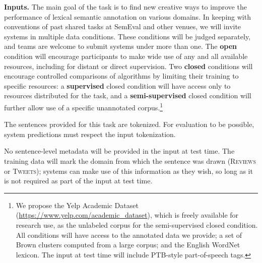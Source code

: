\documentclass[11pt]{article}
\newcommand{\ensuretext}[1]{#1}
\newcommand{\nssmarker}{\ensuretext{\textcolor{magenta}{\ensuremath{^{\textsc{NS}}_{\textsc{S}}}}}}
\newcommand{\arkcomment}[3]{\ensuretext{\textcolor{#3}{[#1 #2]}}}
\newcommand{\nss}[1]{\arkcomment{\nssmarker}{#1}{magenta}}
\newcommand{\shortversion}[1]{}
\newcommand{\longversion}[1]{#1} %
\begin{document}
\textbf{Inputs.}
The main goal of the task is to find new creative ways to improve the performance of lexical semantic annotation on various domains. 
In keeping with conventions of past shared tasks at SemEval and other venues, 
we will invite systems in multiple data conditions.
These conditions will be judged separately, and teams are welcome to submit systems under more than one.
The \textbf{open} condition will encourage participants to make 
wide use of any and all available resources, including for 
distant or direct supervision. 
Two \textbf{closed} conditions will encourage controlled comparisons of algorithms 
by limiting their training to specific resources: 
a \textbf{supervised} closed condition will have access only to resources distributed for the task, 
and a \textbf{semi-supervised} closed condition will further allow use of a specific unannotated corpus.\footnote{%
We propose the Yelp Academic Dataset (\url{https://www.yelp.com/academic_dataset}), 
which is freely available for research use, as the unlabeled corpus for the semi-supervised closed condition.
All conditions will have access to the annotated data we provide; 
a set of Brown clusters \citep{brown-92} computed from a large corpus; and the \longversion{English }WordNet lexicon. 
The input at test time will include \longversion{PTB-style part-of-speech}\shortversion{POS} tags. 
\shortversion{No sentence-level metadata will be provided at test time, 
but the domain of the sentence will be marked in the training data.}}

\longversion{The sentences provided for this task are tokenized. 
For evaluation to be possible, system predictions must respect the input tokenization.}

\longversion{
No sentence-level metadata will be provided in the input at test time.
The training data will mark the domain from which the sentence was drawn 
(\textsc{Reviews} or \textsc{Tweets}); systems can make use of this information as they wish, 
so long as it is not required as part of the input at test time.}
\end{document}
